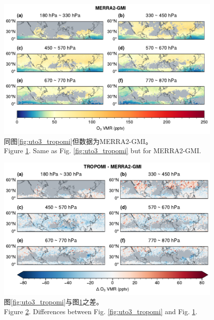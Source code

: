 \begin{figure}[!htbp]
    \centering
    \includegraphics[width=15cm]{./figures/uto3_merra2-gmi.pdf}
    \caption{
    同图\ref{fig:uto3_tropomi}但数据为MERRA2-GMI。 \\
    Figure \ref{fig:uto3_merra2}. Same as Fig. \ref{fig:uto3_tropomi} but for MERRA2-GMI.
    }
    \label{fig:uto3_merra2}
\end{figure}


\begin{figure}[!htbp]
    \centering
    \includegraphics[width=15cm]{./figures/uto3_delta.pdf}
    \caption{
    图\ref{fig:uto3_tropomi}与图\ref{fig:uto3_merra2}之差。 \\
    Figure \ref{fig:uto3_delta}. Differences between Fig. \ref{fig:uto3_tropomi} and Fig. \ref{fig:uto3_merra2}.
    }
    \label{fig:uto3_delta}
\end{figure}


